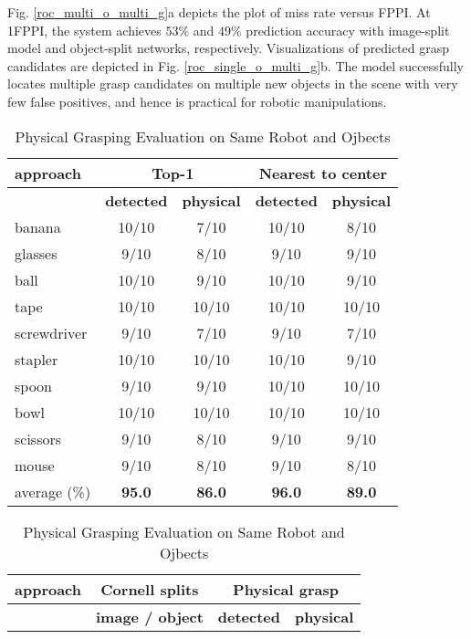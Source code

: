 \documentclass[letterpaper, 10 pt, journal, twoside]{IEEEtran}
\begin{document}
Fig. \ref{roc_multi_o_multi_g}a depicts the plot of miss rate versus
FPPI. At 1FPPI, the system achieves $53\%$ and $49\%$ prediction accuracy
with image-split model and object-split networks, respectively. 
Visualizations of predicted grasp candidates are depicted in Fig.
\ref{roc_single_o_multi_g}b.  The model successfully locates multiple grasp
candidates on multiple new objects in the scene with very few false
positives, and hence is practical for robotic manipulations.      



\begin {table}[t]
  \centering
\caption {Physical Grasping Comparison  }
  \small
  \begin{tabular}{ | l | c | c | c | c |}
    \hline
{\bf approach} & \multicolumn{2}{c|}{ \bf{Top-1}} & \multicolumn{2}{c|}{ \bf{Nearest to center}} \\ \hline
                 & \bf{detected} & \bf{physical} & \bf{detected} & \bf{physical} \\ \hline
    
    banana       & 10/10   &  7/10   & 10/10   &  8/10  \\ \hline
    glasses      &  9/10   &  8/10   &  9/10   &  9/10  \\ \hline
    ball         & 10/10   &  9/10   & 10/10   &  9/10  \\ \hline
    tape	         & 10/10   & 10/10   & 10/10   & 10/10  \\ \hline
    screwdriver  &  9/10   &  7/10   &  9/10   &  7/10  \\ \hline
    stapler      & 10/10   & 10/10   & 10/10   &  9/10  \\ \hline
    spoon        &  9/10   &  9/10   & 10/10   & 10/10  \\ \hline
    bowl         & 10/10   & 10/10   & 10/10   & 10/10  \\ \hline
    scissors     &  9/10   &  8/10   &  9/10   &  9/10  \\ \hline
    mouse        &  9/10   &  8/10   &  9/10   &  8/10  \\ \hline \hline
    average (\%) &\bf{95.0}&\bf{86.0}&\bf{96.0}&\bf{89.0}\\

    \hline
  \end{tabular}


  \vspace*{2.00ex}
\caption {Physical Grasping Evaluation on Same Robot and Ojbects  }
  \small
  \begin{tabular}{ | l | c | c | c |}
    \hline
{\bf approach} &  \bf{Cornell splits} & \multicolumn{2}{c|}{ \bf{Physical grasp}} \\ \hline
                 & \bf{image / object} & \bf{detected} & \bf{physical} \\ \hline
    

\end{tabular}
\end{table}
\end{document}
